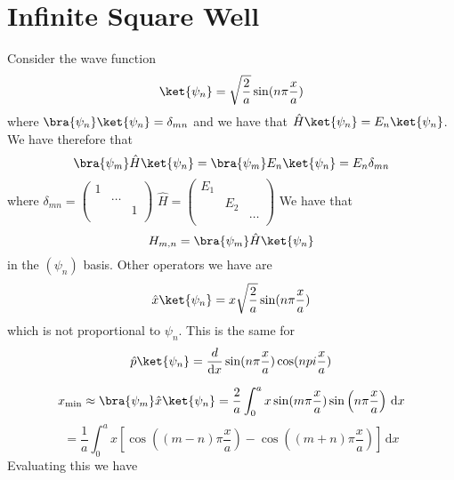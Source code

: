 \section{Infinite Square Well}
Consider the wave function
\[
    \ket{\psi _n} = \sqrt{\frac{2}{a}} \sin (n \pi \frac{x}{a}) 
\]
where \(\bra{\psi _n} \ket{\psi_n} = \delta_{mn} \) and we have that 
\(\hat{H} \ket{\psi _n} =E_n \ket{\psi _n}\). We have therefore that 
\[
    \bra{\psi _m} \hat{H} \ket{\psi _n} = \bra{\psi _m} E_n \ket{\psi _n} = E_n \delta_{mn} 
\]
where \(\delta_{mn} = \begin{pmatrix}
    1 &  &   \\
     & \dots  &   \\
     &  &  1 \\
\end{pmatrix} \) 
\(\hat{H}  = \begin{pmatrix}
    E_1 &  &   \\
     & E_2 &   \\
     &  & \dots   \\
\end{pmatrix}\) 
We have that 
\[
    H_{m,n} = \bra{\psi _m} \hat{H} \ket{\psi _n}
\]
in the \( (\psi _n) \) basis. Other operators we have are
\[
    \hat{x} \ket{\psi _n} = x \sqrt{\frac{2}{a}} \sin (n \pi \frac{x}{a}) 
\] which is not proportional to \(\psi _n\). This is the same for
\[
    \hat{p} \ket{\psi _n} = \frac{d}{\mathrm{d}x } \sin (n \pi  \frac{x}{a}) \cos (npi \frac{x}{a})
\]

\[
    x_{\min } \approx \bra{\psi _m} \hat{x} \ket{\psi _n} = 
    \frac{2}{a} \int_{0}^{a} x \sin (m \pi  \frac{x}{a}) \sin \left( n \pi \frac{x}{a} \right)  \,\mathrm{d}x  
\]
\[
    = \frac{1}{a} \int_{0}^{a} x \left[ \cos \left( (m-n)\pi \frac{x}{a} \right)  - \cos \left( (m+n)\pi \frac{x}{a} \right) \right]  \,\mathrm{d}x 
\]
Evaluating this we have 